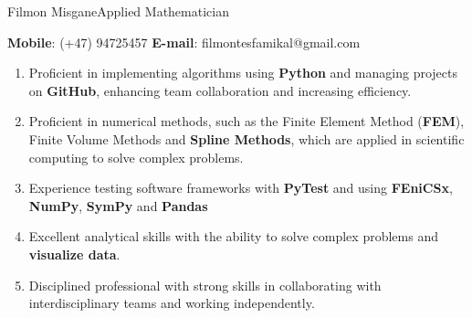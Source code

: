 \documentclass{article}
\begin{document}
\begin{cv}{Filmon Misgane}{Applied Mathematician}%

    \textbf{Mobile}: (+47) 94725457 \quad \textbf{E-mail}: filmontesfamikal@gmail.com


    \begin{enumerate}
        \item Proficient in implementing algorithms using \textbf{Python} and managing projects on \textbf{GitHub}, enhancing team collaboration and increasing efficiency.
        \item Proficient in numerical methods, such as the Finite Element Method (\textbf{FEM}), Finite Volume Methods and \textbf{Spline Methods}, which are applied in scientific computing to solve complex problems. %
        \item Experience testing software frameworks with \textbf{PyTest} and using \textbf{FEniCSx}, \textbf{NumPy}, \textbf{SymPy} and \textbf{Pandas}
        \item Excellent analytical skills with the ability to solve complex problems and \textbf{visualize data}.
        \item Disciplined professional with strong skills in collaborating with interdisciplinary teams and working independently.


\end{enumerate}
\end{cv}
\end{document}
